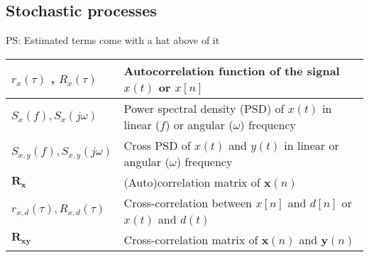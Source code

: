 \subsection{Stochastic processes}
PS: Estimated terms come with a hat above of it
\begin{xltabular}{\textwidth}{XX}
	\(r_x(\tau)\) \cite{nossekAdaptiveArraySignal2015}, \(R_x(\tau)\)                                                                              & Autocorrelation function of the signal \(x(t)\) or \(x[n]\)                                                                                                                                                                        \\ \hline
	\(S_x(f), S_x(j\omega)\)                                                                                                                       & Power spectral density (PSD) of \(x(t)\) in linear (\(f\)) or angular (\(\omega\)) frequency                                                                                                                                       \\ \hline
	\(S_{x,y}(f), S_{x,y}(j\omega)\)                                                                                                               & Cross PSD of \(x(t)\) and \(y(t)\) in linear or angular (\(\omega\)) frequency                                                                                                                                                     \\ \hline
	\(\mathbf{R}_\mathbf{x}\)                                                                                                                      & (Auto)correlation matrix of \(\mathbf{x}(n)\)                                                                                                                                                                                      \\ \hline
	\(r_{x,d}(\tau), R_{x,d}(\tau)\)                                                                                                               & Cross-correlation between \(x[n]\) and \(d[n]\) or \(x(t)\) and \(d(t)\) \cite{nossekAdaptiveArraySignal2015}                                                                                                                      \\ \hline
	\(\mathbf{R}_\mathbf{xy}\)                                                                                                                     & Cross-correlation matrix of \(\mathbf{x}(n)\) and \(\mathbf{y}(n)\)                                                                                                                                                                \\ \hline

\end{xltabular}
